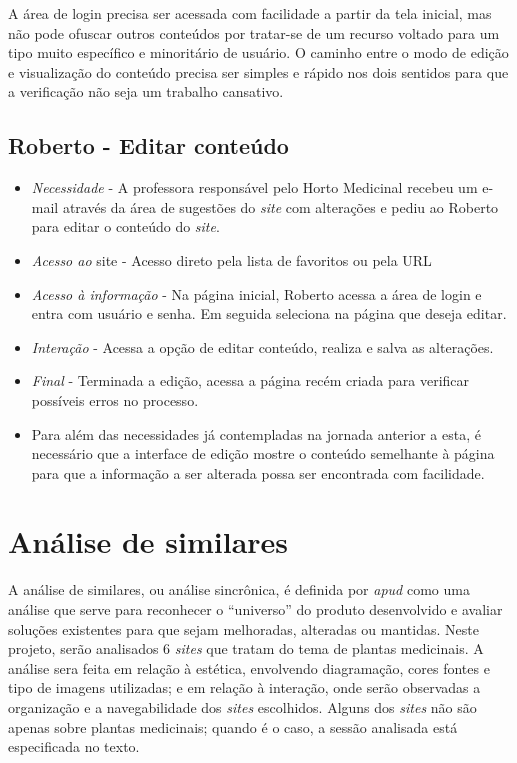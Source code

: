 A área de login precisa ser acessada com facilidade a partir da tela inicial, mas não pode ofuscar outros conteúdos por tratar-se de um recurso voltado para um tipo muito específico e minoritário de usuário. O caminho entre o modo de edição e visualização do conteúdo precisa ser simples e rápido nos dois sentidos para que a verificação não seja um trabalho cansativo.

\subsection{Roberto - Editar conteúdo}\label{roberto---editar-conteudo}

\begin{itemize}
\item
  \emph{Necessidade} - A professora responsável pelo Horto Medicinal recebeu um e-mail através da área de sugestões do \emph{site} com alterações e pediu ao Roberto para editar o conteúdo do \emph{site}.
\item
  \emph{Acesso ao} site - Acesso direto pela lista de favoritos ou pela URL
\item
  \emph{Acesso à informação} - Na página inicial, Roberto acessa a área de login e entra com usuário e senha. Em seguida seleciona na página que deseja editar.
\item
  \emph{Interação} - Acessa a opção de editar conteúdo, realiza e salva as alterações.
\item
  \emph{Final} - Terminada a edição, acessa a página recém criada para verificar possíveis erros no processo.
\item
  Para além das necessidades já contempladas na jornada anterior a esta, é necessário que a interface de edição mostre o conteúdo semelhante à página para que a informação a ser alterada possa ser encontrada com facilidade.
\end{itemize}

\section{Análise de similares}\label{analise-de-similares}

A análise de similares, ou análise sincrônica, é definida por \textcite{bonsiepe83} \emph{apud} \textcite{pazmino10} como uma análise que serve para reconhecer o ``universo'' do produto desenvolvido e avaliar soluções existentes para que sejam melhoradas, alteradas ou mantidas.
Neste projeto, serão analisados 6 \emph{sites} que tratam do tema de plantas medicinais. A análise sera feita em relação à estética, envolvendo diagramação, cores fontes e tipo de imagens utilizadas; e em relação à interação, onde serão observadas a organização e a navegabilidade dos \emph{sites} escolhidos.
Alguns dos \emph{sites} não são apenas sobre plantas medicinais; quando é o caso, a sessão analisada está especificada no texto.


